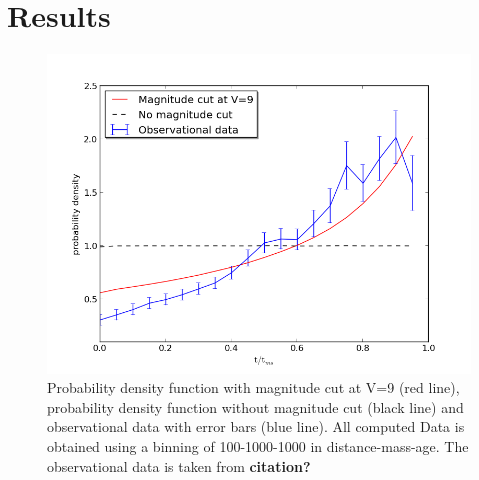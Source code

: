 \documentclass[a4paper,10pt]{article}
\begin{document}
 \section{Results}
 \begin{figure}[h!]
   \includegraphics[width=\textwidth]{plot1}
   \caption{Probability density function with magnitude cut at V=9 (red line), probability density function without magnitude cut
   (black line) and observational data with error bars (blue line). All computed Data is obtained using a binning of 100-1000-1000
   in distance-mass-age. The observational data is taken from \textbf{citation?}\label{all3}}
 \end{figure}
 
\end{document}
